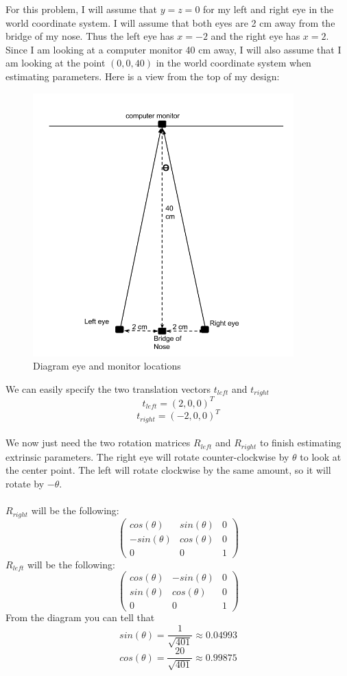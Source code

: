 \documentclass[11pt,psfig]{article}
\begin{document}
For this problem, I will assume that $y=z=0$ for my left and right eye in the world coordinate system. I will assume that both eyes are 2 cm away from the bridge of my nose. Thus the left eye has $x=-2$ and the right eye has $x=2$. Since I am looking at a computer monitor 40 cm away, I will also assume that I am looking at the point $(0,0,40)$ in the world coordinate system when estimating parameters. Here is a view from the top of my design:
\begin{figure}[H]
\centering
\includegraphics[height=4in]{hw1prob2drawing2.png}
\caption{Diagram eye and monitor locations}
\end{figure}
We can easily specify the two translation vectors $t_{left}$ and $t_{right}$\\
\[
t_{left} = (2,0,0)^T
\]
\[
t_{right} = (-2,0,0)^T
\]
\\
We now just need the two rotation matrices $R_{left}$ and $R_{right}$ to finish estimating extrinsic parameters. 
\newpage
The right eye will rotate counter-clockwise by $\theta$ to look at the center point. The left will rotate clockwise by the same amount, so it will rotate by $-\theta$.\\
\\
$R_{right}$ will be the following:
\[ \left( \begin{array}{ccc}
cos(\theta) & sin(\theta) & 0  \\
-sin(\theta) & cos(\theta) & 0 \\
0 & 0 & 1
 \end{array} \right)\]
$R_{left}$ will be the following:
\[ \left( \begin{array}{ccc}
cos(\theta) & -sin(\theta) & 0  \\
sin(\theta) & cos(\theta) & 0 \\
0 & 0 & 1
 \end{array} \right)\]
From the diagram you can tell that 
\[
sin(\theta) = \frac{1}{\sqrt{401}} \approx 0.04993
\]
\[
cos(\theta)=\frac{20}{\sqrt{401}} \approx 0.99875
\]
\newpage
\end{document}
